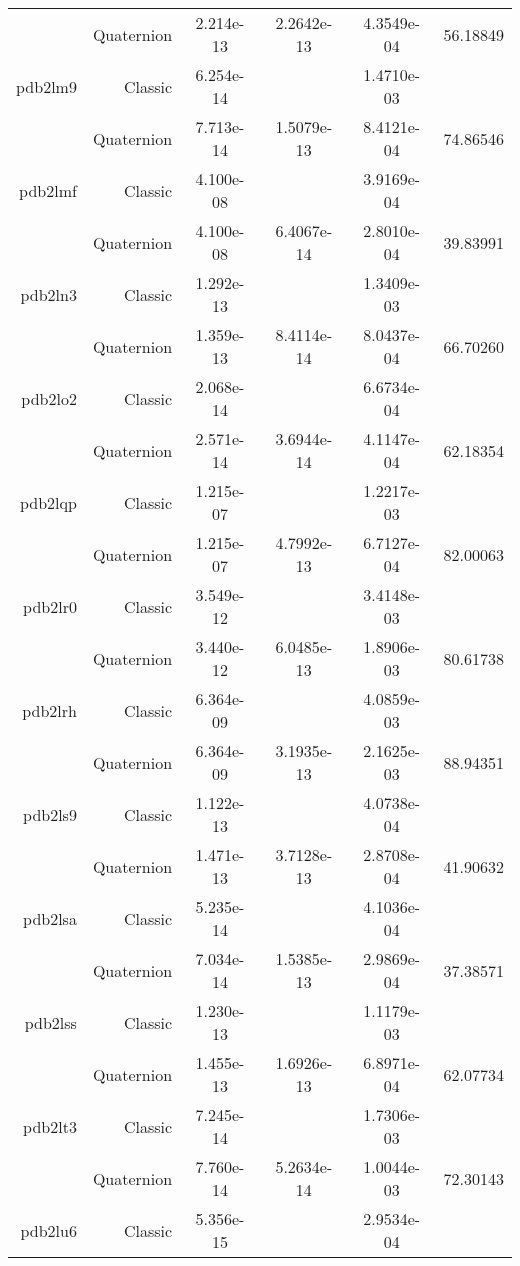 \begin{xltabular}{\textwidth}{r|rS[table-format=1.3e+2]S[table-format=1.4e+2]S[table-format=1.4e+2]S[table-format=-1.5]}
& Quaternion & 2.214e-13 & 2.2642e-13 & 4.3549e-04 & 56.18849\\  \addlinespace
pdb2lm9 & Classic & 6.254e-14 &  & 1.4710e-03 & \\
& Quaternion & 7.713e-14 & 1.5079e-13 & 8.4121e-04 & 74.86546\\  \addlinespace
pdb2lmf & Classic & 4.100e-08 &  & 3.9169e-04 & \\
& Quaternion & 4.100e-08 & 6.4067e-14 & 2.8010e-04 & 39.83991\\  \addlinespace
pdb2ln3 & Classic & 1.292e-13 &  & 1.3409e-03 & \\
& Quaternion & 1.359e-13 & 8.4114e-14 & 8.0437e-04 & 66.70260\\  \addlinespace
pdb2lo2 & Classic & 2.068e-14 &  & 6.6734e-04 & \\
& Quaternion & 2.571e-14 & 3.6944e-14 & 4.1147e-04 & 62.18354\\  \addlinespace
pdb2lqp & Classic & 1.215e-07 &  & 1.2217e-03 & \\
& Quaternion & 1.215e-07 & 4.7992e-13 & 6.7127e-04 & 82.00063\\  \addlinespace
pdb2lr0 & Classic & 3.549e-12 &  & 3.4148e-03 & \\
& Quaternion & 3.440e-12 & 6.0485e-13 & 1.8906e-03 & 80.61738\\  \addlinespace
pdb2lrh & Classic & 6.364e-09 &  & 4.0859e-03 & \\
& Quaternion & 6.364e-09 & 3.1935e-13 & 2.1625e-03 & 88.94351\\  \addlinespace
pdb2ls9 & Classic & 1.122e-13 &  & 4.0738e-04 & \\
& Quaternion & 1.471e-13 & 3.7128e-13 & 2.8708e-04 & 41.90632\\  \addlinespace
pdb2lsa & Classic & 5.235e-14 &  & 4.1036e-04 & \\
& Quaternion & 7.034e-14 & 1.5385e-13 & 2.9869e-04 & 37.38571\\  \addlinespace
pdb2lss & Classic & 1.230e-13 &  & 1.1179e-03 & \\
& Quaternion & 1.455e-13 & 1.6926e-13 & 6.8971e-04 & 62.07734\\  \addlinespace
pdb2lt3 & Classic & 7.245e-14 &  & 1.7306e-03 & \\
& Quaternion & 7.760e-14 & 5.2634e-14 & 1.0044e-03 & 72.30143\\  \addlinespace
pdb2lu6 & Classic & 5.356e-15 &  & 2.9534e-04 & \\

\end{xltabular}
